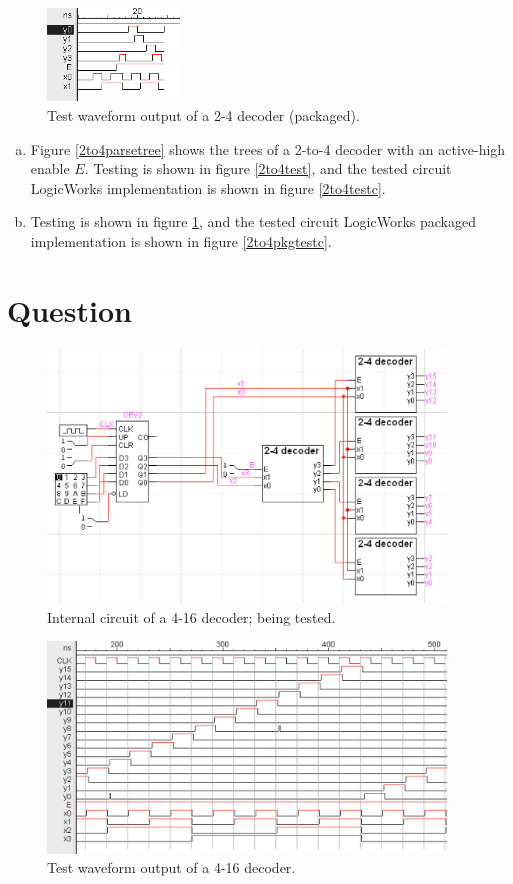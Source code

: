 \documentclass[11pt]{article}
\begin{document}
\begin{figure}[h]
	\centering
	\includegraphics[width=100pt]{2to4pkgtest}
	\caption{Test waveform output of a 2-4 decoder (packaged).}
	\label{2to4pkgtest}
\end{figure}

\begin{enumerate}[(a)]
	\item{Figure \ref{2to4parsetree} shows the trees of a 2-to-4 decoder with an active-high enable $E$. Testing is shown in figure \ref{2to4test}, and the tested circuit LogicWorks implementation is shown in figure \ref{2to4testc}.}
	\item{Testing is shown in figure \ref{2to4pkgtest}, and the tested circuit LogicWorks packaged implementation is shown in figure \ref{2to4pkgtestc}.}
\end{enumerate}

\section{Question}

\begin{figure}[h]
	\centering
	\includegraphics[width=300pt]{4to16testc}
	\caption{Internal circuit of a 4-16 decoder; being tested.}
	\label{4to16testc}
\end{figure}

\begin{figure}[h]
	\centering
	\includegraphics[width=300pt]{4to16test}
	\caption{Test waveform output of a 4-16 decoder.}
	\label{4to16test}
\end{figure}
\end{document}
